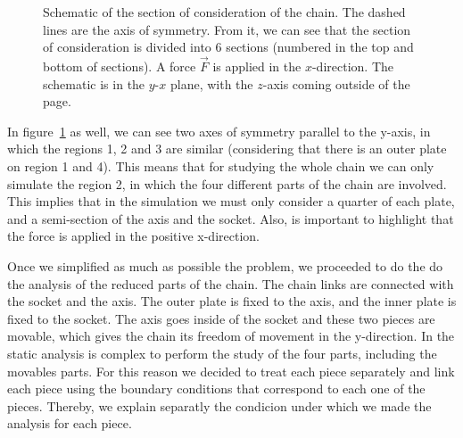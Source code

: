 \documentclass[a4paper 12pt]{article}
\begin{document}
\begin{figure}[!htbp]
\begin{center}
\end{center}
\caption{Schematic of the section of consideration of the chain. The dashed lines are the axis of symmetry. From it, we can see that the section of consideration is divided into 6 sections (numbered in the top and bottom of sections). A force $\vec{F}$ is applied in the $x$-direction. The schematic is in the $y$-$x$ plane, with the $z$-axis coming outside of the page.}
\label{chain_union}
\end{figure}

In figure~\ref{chain_union} as well, we can see two axes of symmetry parallel to the y-axis, in which the regions 1, 2 and 3 are similar (considering that there is an outer plate on region 1 and 4). This means that for studying the whole chain we can only simulate the region 2, in which the four different parts of the chain are involved. This implies that in the simulation we must only consider a quarter of each plate, and a semi-section of the axis and the socket. Also, is important to highlight that the force is applied in the positive x-direction.

Once we simplified as much as possible the problem, we proceeded to do the do the analysis of the reduced parts of the chain. The chain links are connected with the socket and the axis. The outer plate is fixed to the axis, and the inner plate is fixed to the socket. The axis goes inside of the socket and these two pieces are movable, which gives the chain its freedom of movement in the y-direction. In the static analysis is complex to perform the study of the four parts, including the movables parts. For this reason we decided to treat each piece separately and link each piece using the boundary conditions that correspond to each one of the pieces. Thereby, we explain separatly the condicion under which we made the analysis for each piece.
\end{document}
